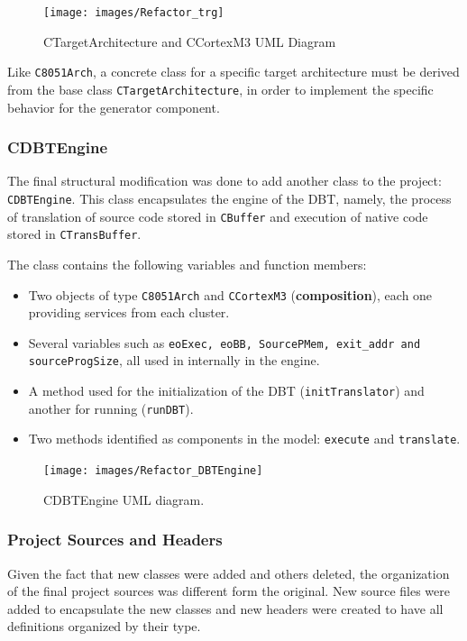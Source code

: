 \begin{figure}[H]
\centerline{
\texttt{[image: images/Refactor\_trg]}
}
\caption{CTargetArchitecture and CCortexM3 UML Diagram}
\label{fig:refactortrg} 
\end{figure}


Like \texttt{C8051Arch}, a concrete class for a specific target architecture must be derived from the base class \texttt{CTargetArchitecture}, in order to implement the specific behavior for the generator component. 


\subsubsection*{CDBTEngine}

The final structural modification was done to add another class to the project: \texttt{CDBTEngine}. This class encapsulates the engine of the DBT, namely, the process of translation of source code stored in \texttt{CBuffer} and execution of native code stored in \texttt{CTransBuffer}. 

The class contains the following variables and function members:
\begin{itemize}
\item Two objects of type \texttt{C8051Arch} and \texttt{CCortexM3} (\textbf{composition}), each one providing services from each cluster.
\item Several variables such as \texttt{eoExec, eoBB, SourcePMem, exit\_addr and sourceProgSize}, all used in internally in the engine.
\item A method used for the initialization of the DBT (\texttt{initTranslator}) and another for running (\texttt{runDBT}).
\item Two methods identified as components in the model: \texttt{execute} and \texttt{translate}.
\end{itemize}


\begin{figure}[H]
\centerline{
\texttt{[image: images/Refactor\_DBTEngine]}
}
\caption{CDBTEngine UML diagram.}
\label{fig:refactorproject} 
\end{figure}


\subsubsection*{Project Sources and Headers}

Given the fact that new classes were added and others deleted, the organization of the final project sources was different form the original. New source files were added to encapsulate the new classes and new headers were created to have all definitions organized by their type.


